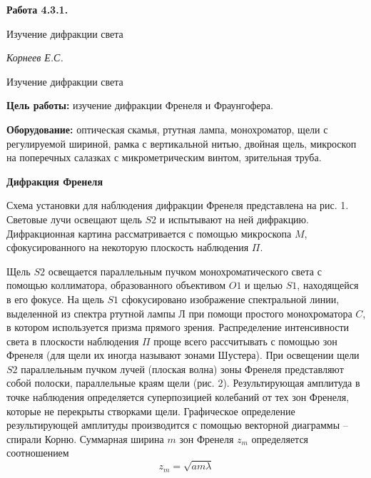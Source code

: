\documentclass[14pt]{article}
\begin{document}
\begin{titlepage}
	\begin{center}
		\fontsize{18pt}{20pt}\selectfont
		\textbf{Работа 4.3.1.}	
	
		\vspace{5cm}
		\fontsize{24pt}{25pt}\selectfont
		Изучение дифракции света
	\end{center}
	\begin{flushright}
		\fontsize{18pt}{20pt}\selectfont
		\vspace{14cm}
		\hspace{-3cm}
		\textit{Корнеев Е.С.}
	\end{flushright}		
\end{titlepage}

\begin{center}
	\fontsize{16pt}{18pt}\selectfont	
	Изучение дифракции света
\end{center}


\fontsize{14pt}{16pt}\selectfont
\vspace{1cm}
\textbf{Цель работы:} изучение дифракции Френеля и Фраунгофера.

\vspace{0.5cm}
\textbf{Оборудование:} оптическая скамья, ртутная лампа, монохроматор, щели с регулируемой шириной, рамка с вертикальной нитью, двойная щель, микроскоп на поперечных салазках с микрометрическим винтом, зрительная труба.

\vspace{1cm}
\textbf{Дифракция Френеля}

Схема установки для наблюдения дифракции Френеля представлена на рис. 1. Световые лучи освещают щель $S2$ и испытывают на ней дифракцию. Дифракционная картина рассматривается с помощью микроскопа $M$, сфокусированного на некоторую плоскость наблюдения $\Pi$.


Щель $S2$ освещается параллельным пучком монохроматического света с помощью коллиматора, образованного объективом $O1$ и щелью $S1$, находящейся в его фокусе. На щель $S1$ сфокусировано изображение спектральной линии, выделенной из спектра ртутной лампы $Л$ при помощи простого монохроматора $C$, в котором используется призма прямого зрения. Распределение интенсивности света в плоскости наблюдения $\Pi$ проще всего рассчитывать с помощью зон Френеля (для щели их иногда называют зонами Шустера). При освещении щели $S2$ параллельным пучком лучей (плоская волна) зоны Френеля представляют собой полоски, параллельные краям щели (рис. 2). Результирующая амплитуда в точке наблюдения определяется суперпозицией колебаний от тех зон Френеля, которые не перекрыты створками щели. Графическое определение результирующей амплитуды производится с помощью векторной диаграммы -- спирали Корню. Суммарная ширина $m$ зон Френеля $z_m$ определяется соотношением
$$
	z_m = \sqrt{am\lambda}
$$
\end{document}
